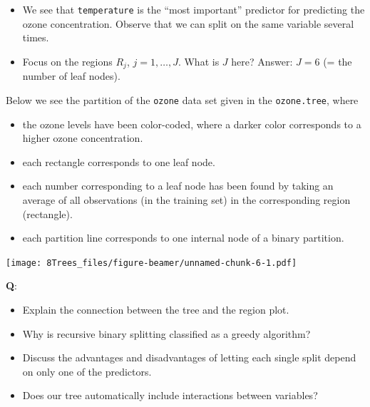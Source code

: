 \documentclass[10pt,ignorenonframetext,]{beamer}
\providecommand{\tightlist}{%
  \setlength{\itemsep}{0pt}\setlength{\parskip}{0pt}}
\begin{document}
\begin{frame}[fragile]

\begin{itemize}
\item
  We see that \texttt{temperature} is the ``most important'' predictor
  for predicting the ozone concentration. Observe that we can split on
  the same variable several times.
\item
  Focus on the regions \(R_j\), \(j=1,\ldots, J\). What is \(J\) here?
  Answer: \(J=6\) (= the number of leaf nodes).
\end{itemize}

\vspace{2mm} Below we see the partition of the \texttt{ozone} data set
given in the \texttt{ozone.tree}, where

\begin{itemize}
\tightlist
\item
  the ozone levels have been color-coded, where a darker color
  corresponds to a higher ozone concentration.
\item
  each rectangle corresponds to one leaf node.
\item
  each number corresponding to a leaf node has been found by taking an
  average of all observations (in the training set) in the corresponding
  region (rectangle).
\item
  each partition line corresponds to one internal node of a binary
  partition.
\end{itemize}

\end{frame}

\begin{frame}

\texttt{[image: 8Trees\_files/figure-beamer/unnamed-chunk-6-1.pdf]}

\textbf{Q}:

\begin{itemize}
\tightlist
\item
  Explain the connection between the tree and the region plot.
\item
  Why is recursive binary splitting classified as a greedy algorithm?
\item
  Discuss the advantages and disadvantages of letting each single split
  depend on only one of the predictors.
\item
  Does our tree automatically include interactions between variables?
\end{itemize}

\end{frame}
\end{document}
